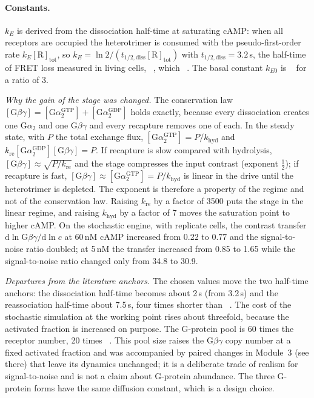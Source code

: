 \paragraph{Constants.}
$k_E$ is derived from the dissociation half-time at saturating cAMP: when all receptors are occupied the heterotrimer is consumed with the pseudo-first-order rate $k_E[\mathrm R]_\mathrm{tot}$, so $k_E=\ln2/(t_{1/2,\mathrm{diss}}[\mathrm R]_\mathrm{tot})$ with $t_{1/2,\mathrm{diss}}=3.2$\,s, the half-time of FRET loss measured in living cells, ~\cite{tang2014}, which ~\cite{biswas2021}.
The basal constant $k_{E0}$ is ~\cite{biswas2021} for a ratio of 3.

\emph{Why the gain of the stage was changed.}
The conservation law $[\mathrm G\beta\gamma]=[\mathrm G\alpha_2^\mathrm{GTP}]+[\mathrm G\alpha_2^\mathrm{GDP}]$ holds exactly, because every dissociation creates one G$\alpha_2$ and one G$\beta\gamma$ and every recapture removes one of each.
In the steady state, with $P$ the total exchange flux, $[\mathrm G\alpha_2^\mathrm{GTP}]=P/k_\mathrm{hyd}$ and $k_\mathrm{re}[\mathrm G\alpha_2^\mathrm{GDP}][\mathrm G\beta\gamma]=P$.
If recapture is slow compared with hydrolysis, $[\mathrm G\beta\gamma]\approx\sqrt{P/k_\mathrm{re}}$ and the stage compresses the input contrast (exponent $\tfrac12$); if recapture is fast, $[\mathrm G\beta\gamma]\approx[\mathrm G\alpha_2^\mathrm{GTP}]=P/k_\mathrm{hyd}$ is linear in the drive until the heterotrimer is depleted.
The exponent is therefore a property of the regime and not of the conservation law.
Raising $k_\mathrm{re}$ by a factor of 3500 puts the stage in the linear regime, and raising $k_\mathrm{hyd}$ by a factor of 7 moves the saturation point to higher cAMP.
On the stochastic engine, with replicate cells, the contrast transfer $\mathrm d\ln\mathrm G\beta\gamma/\mathrm d\ln c$ at 60\,nM cAMP increased from 0.22 to 0.77 and the signal-to-noise ratio doubled; at 5\,nM the transfer increased from 0.85 to 1.65 while the signal-to-noise ratio changed only from 34.8 to 30.9.

\emph{Departures from the literature anchors.}
The chosen values move the two half-time anchors: the dissociation half-time becomes about 2\,s (from 3.2\,s) and the reassociation half-time about 7.5\,s, four times shorter than ~\cite{tang2014}.
The cost of the stochastic simulation at the working point rises about threefold, because the activated fraction is increased on purpose.
The G-protein pool is 60 times the receptor number, 20 times ~\cite{biswas2021}.
This pool size raises the G$\beta\gamma$ copy number at a fixed activated fraction and was accompanied by paired changes in Module~3 (see there) that leave its dynamics unchanged; it is a deliberate trade of realism for signal-to-noise and is not a claim about G-protein abundance.
The three G-protein forms have the same diffusion constant, which is a design choice.
